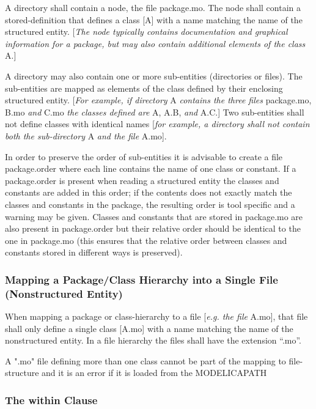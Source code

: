 A directory shall contain a node, the file package.mo. The node shall contain a stored-definition that defines a class {[}A{]} with a name
matching the name of the structured entity. {[}\emph{The node typically
contains documentation and graphical information for a package, but may
also contain additional elements of the class} A.{]}

A directory may also contain one or more sub-entities (directories or
files). The sub-entities are mapped as elements of the class defined by
their enclosing structured entity. {[}\emph{For example, if directory} A
\emph{contains the three files} package.mo, B.mo \emph{and} C.mo
\emph{the classes defined are} A, A.B, \emph{and} A.C.{]} Two
sub-entities shall not define classes with identical names {[}\emph{for
example, a directory shall not contain both the sub-directory} A
\emph{and the file} A.mo{]}.

In order to preserve the order of sub-entities it is advisable to create
a file package.order where each line contains the name of one class or
constant. If a package.order is present when reading a structured entity
the classes and constants are added in this order; if the contents does
not exactly match the classes and constants in the package, the
resulting order is tool specific and a warning may be given. Classes and
constants that are stored in package.mo are also present in
package.order but their relative order should be identical to the one in
package.mo (this ensures that the relative order between classes and
constants stored in different ways is preserved).

\subsubsection{Mapping a Package/Class Hierarchy into a Single File (Nonstructured Entity)}

When mapping a package or class-hierarchy to a file {[}\emph{e.g. the
  file} A.mo{]}, that file shall only define a single class {[}A.mo{]} with a
name matching the name of the nonstructured entity. In a file hierarchy
the files shall have the extension ``.mo''.

A ".mo" file defining more than one class cannot be part of the mapping
to file-structure and it is an error if it is loaded from the
MODELICAPATH

\subsubsection{The within Clause}

